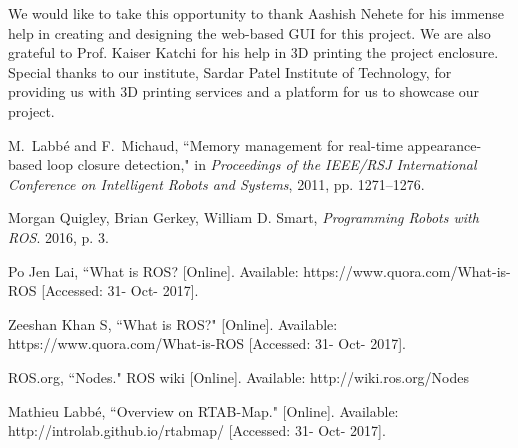 \documentclass[journal]{IEEEtran}
\begin{document}
We would like to take this opportunity to thank Aashish Nehete for his immense help in creating and designing the web-based GUI for this project. We are also grateful to Prof. Kaiser Katchi for his help in 3D printing the project enclosure.
Special thanks to our institute, Sardar Patel Institute of Technology, for providing us with 3D printing services and a platform for us to showcase our project.


\ifCLASSOPTIONcaptionsoff
  \newpage
\fi





%
%
%
\begin{thebibliography}{1}

M.~Labbé and F.~Michaud, ``Memory management for real-time appearance-based loop closure detection,"
in \emph{Proceedings of the IEEE/RSJ International Conference on Intelligent Robots and Systems}, 2011, pp. 1271–1276.

Morgan Quigley, Brian Gerkey, William D. Smart, \emph{Programming Robots with ROS}. 2016, p. 3.

Po Jen Lai, ``What is ROS? [Online]. Available: 
https://www.quora.com/What-is-ROS
[Accessed: 31- Oct- 2017].

Zeeshan Khan S, ``What is ROS?" [Online]. Available: 
https://www.quora.com/What-is-ROS
[Accessed: 31- Oct- 2017].

ROS.org, ``Nodes." ROS wiki [Online]. Available: http://wiki.ros.org/Nodes

Mathieu Labbé, ``Overview on RTAB-Map." [Online]. Available: 
http://introlab.github.io/rtabmap/
[Accessed: 31- Oct- 2017].

\end{thebibliography}
\end{document}

